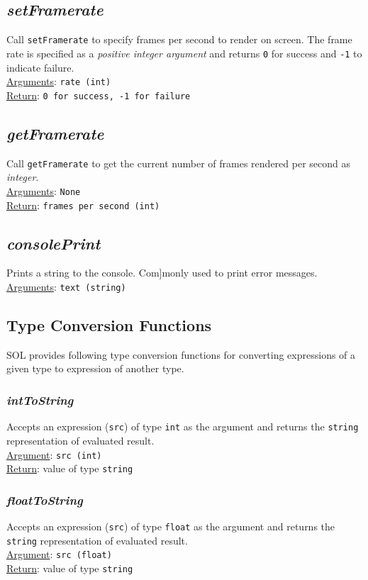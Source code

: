 \documentclass[letterpaper,12pt]{article}
\begin{document}
    \subsection{\textit{setFramerate}}
    Call \texttt{setFramerate} to specify frames per second to render on screen. The frame rate is specified as a \textit{positive integer argument} and returns \texttt{0} for success and \texttt{-1} to indicate failure.\\
    \underline{Arguments}: \texttt{rate (int)}\\
    \underline{Return}: \texttt{0 for success, -1 for failure}

    \subsection{\textit{getFramerate}}
    Call \texttt{getFramerate} to get the current number of frames rendered per second as \textit{integer}.\\
    \underline{Arguments}: \texttt{None}\\
    \underline{Return}: \texttt{frames per second (int)}

    \subsection{\textit{consolePrint}}
    Prints a string to the console. Com]monly used to print error messages.\\
    \underline{Arguments}: \texttt{text (string)}

    \subsection{Type Conversion Functions}
    SOL provides following type conversion functions for converting expressions of a given type to expression of another type.

    \subsubsection{\textit{intToString}}
    Accepts an expression (\texttt{src}) of type \texttt{int} as the argument and returns the \texttt{string} representation of evaluated result.\\
    \underline{Argument}: \texttt{src (int)}\\
    \underline{Return}: value of type \texttt{string}

    \subsubsection{\textit{floatToString}}
    Accepts an expression (\texttt{src}) of type \texttt{float} as the argument and returns the \texttt{string} representation of evaluated result.\\
    \underline{Argument}: \texttt{src (float)}\\
    \underline{Return}: value of type \texttt{string}
\end{document}
